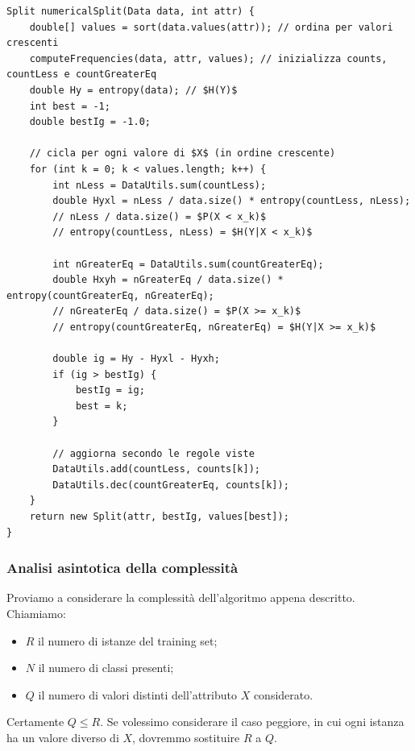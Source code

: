 \documentclass[a4paper,11pt,twoside,openright,fleqn]{book}
\begin{document}
\begin{lstlisting}[float=ptb,mathescape,caption=Codice per il calcolo dell'information gain per attributi numerici nell'implementazione ottimizzata,label=code:optIgSplit]
Split numericalSplit(Data data, int attr) {
    double[] values = sort(data.values(attr)); // ordina per valori crescenti
    computeFrequencies(data, attr, values); // inizializza counts, countLess e countGreaterEq
    double Hy = entropy(data); // $H(Y)$
    int best = -1;
    double bestIg = -1.0;
    
    // cicla per ogni valore di $X$ (in ordine crescente)
    for (int k = 0; k < values.length; k++) {
        int nLess = DataUtils.sum(countLess);
        double Hyxl = nLess / data.size() * entropy(countLess, nLess);
        // nLess / data.size() = $P(X < x_k)$
        // entropy(countLess, nLess) = $H(Y|X < x_k)$
        
        int nGreaterEq = DataUtils.sum(countGreaterEq);
        double Hxyh = nGreaterEq / data.size() * entropy(countGreaterEq, nGreaterEq);
        // nGreaterEq / data.size() = $P(X >= x_k)$
        // entropy(countGreaterEq, nGreaterEq) = $H(Y|X >= x_k)$
        
        double ig = Hy - Hyxl - Hyxh;
        if (ig > bestIg) {
            bestIg = ig;
            best = k;
        }
        
        // aggiorna secondo le regole viste
        DataUtils.add(countLess, counts[k]);
        DataUtils.dec(countGreaterEq, counts[k]);
    }
	return new Split(attr, bestIg, values[best]);
}
\end{lstlisting}

\subsubsection{Analisi asintotica della complessità} \label{sec:complessità}

Proviamo a considerare la complessità dell'algoritmo appena descritto. Chiamiamo:
\begin{itemize}
\item $R$ il numero di istanze del training set;
\item $N$ il numero di classi presenti;
\item $Q$ il numero di valori distinti dell'attributo $X$ considerato.
\end{itemize}

Certamente $Q \leq R$. Se volessimo considerare il caso peggiore, in cui ogni istanza ha un valore diverso di $X$, dovremmo sostituire $R$ a $Q$.
\end{document}
